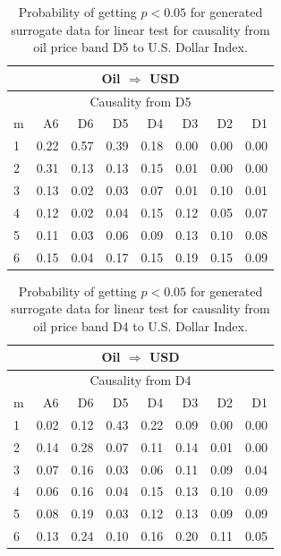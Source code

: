 %
%
\begin{table}[H]
\begin{center}
\begin{tabular}{l|r r r r r r r}
\hline\hline
\multicolumn{8}{c}{Oil $\Rightarrow$ USD}\\
\hline
\multicolumn{8}{c}{Causality from D5}\\
\hline\hline
m & A6 & D6 & D5 & D4 & D3 & D2 & D1 \\
\hline
1 & 0.22 & 0.57 & 0.39 & 0.18 & 0.00 & 0.00 & 0.00 \\
2 & 0.31 & 0.13 & 0.13 & 0.15 & 0.01 & 0.00 & 0.00 \\
3 & 0.13 & 0.02 & 0.03 & 0.07 & 0.01 & 0.10 & 0.01 \\
4 & 0.12 & 0.02 & 0.04 & 0.15 & 0.12 & 0.05 & 0.07 \\
5 & 0.11 & 0.03 & 0.06 & 0.09 & 0.13 & 0.10 & 0.08 \\
6 & 0.15 & 0.04 & 0.17 & 0.15 & 0.19 & 0.15 & 0.09 \\
\hline\hline
\end{tabular}
\caption{Probability of getting $p < 0.05$ for generated surrogate data for linear test for causality from oil price band D5 to U.S. Dollar Index.}
\end{center}
\end{table}

%
%
\begin{table}[H]
\begin{center}
\begin{tabular}{l|r r r r r r r}
\hline\hline
\multicolumn{8}{c}{Oil $\Rightarrow$ USD}\\
\hline
\multicolumn{8}{c}{Causality from D4}\\
\hline\hline
m & A6 & D6 & D5 & D4 & D3 & D2 & D1 \\
\hline
1 & 0.02 & 0.12 & 0.43 & 0.22 & 0.09 & 0.00 & 0.00 \\
2 & 0.14 & 0.28 & 0.07 & 0.11 & 0.14 & 0.01 & 0.00 \\
3 & 0.07 & 0.16 & 0.03 & 0.06 & 0.11 & 0.09 & 0.04 \\
4 & 0.06 & 0.16 & 0.04 & 0.15 & 0.13 & 0.10 & 0.09 \\
5 & 0.08 & 0.19 & 0.03 & 0.12 & 0.13 & 0.09 & 0.09 \\
6 & 0.13 & 0.24 & 0.10 & 0.16 & 0.20 & 0.11 & 0.05 \\
\hline\hline
\end{tabular}
\caption{Probability of getting $p < 0.05$ for generated surrogate data for linear test for causality from oil price band D4 to U.S. Dollar Index.}
\end{center}
\end{table}

